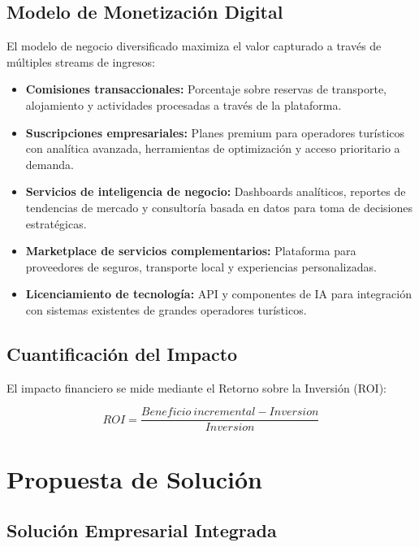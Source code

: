\documentclass[12pt, letterpaper]{article}
\begin{document}
\subsection{Modelo de Monetización Digital}

El modelo de negocio diversificado maximiza el valor capturado a través de múltiples streams de ingresos:

\begin{itemize}
\item \textbf{Comisiones transaccionales:} Porcentaje sobre reservas de transporte, alojamiento y actividades procesadas a través de la plataforma.
\item \textbf{Suscripciones empresariales:} Planes premium para operadores turísticos con analítica avanzada, herramientas de optimización y acceso prioritario a demanda.
\item \textbf{Servicios de inteligencia de negocio:} Dashboards analíticos, reportes de tendencias de mercado y consultoría basada en datos para toma de decisiones estratégicas.
\item \textbf{Marketplace de servicios complementarios:} Plataforma para proveedores de seguros, transporte local y experiencias personalizadas.
\item \textbf{Licenciamiento de tecnología:} API y componentes de IA para integración con sistemas existentes de grandes operadores turísticos.
\end{itemize}

\subsection{Cuantificación del Impacto}

El impacto financiero se mide mediante el Retorno sobre la Inversión (ROI):

\begin{equation}
ROI = \frac{Beneficio\ incremental - Inversion}{Inversion}
\end{equation}

\section{Propuesta de Solución}

\subsection{Solución Empresarial Integrada}
\end{document}
